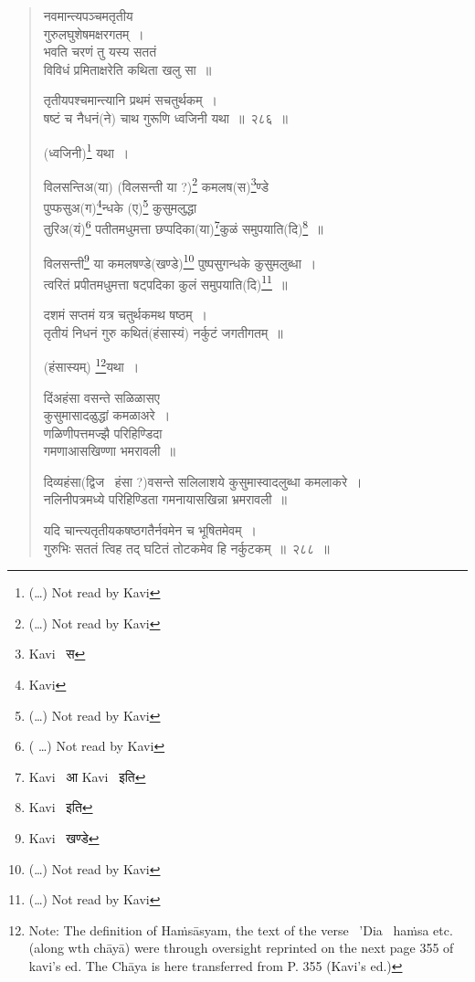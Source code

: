\documentclass[11pt, openany]{book}
\begin{document}
\begin{quote}
{\qt नवमान्त्यपञ्चमतृतीय\textendash \\
गुरुलघुशेषमक्षरगतम्~। \\
भवति चरणं तु यस्य सततं\\
 विविधं प्रमिताक्षरेति कथिता खलु सा~॥}

{\na तृतीयपश्चमान्त्यानि प्रथमं सचतुर्थकम्~। \\
षष्टं च नैधनं(ने) चाथ गुरूणि ध्वजिनी यथा~॥~२८६~॥}

(ध्वजिनी)\renewcommand{\thefootnote}{1}\footnote{(\ldots ) Not read by Kavi} यथा~। 

{\qt विलसन्तिअ(या) (विलसन्ती या ?)\renewcommand{\thefootnote}{2}\footnote{(\ldots ) Not read by Kavi} कमलष(स)\renewcommand{\thefootnote}{3}\footnote{Kavi \textendash\ स}ण्डे \\
पुप्फसुअ(ग)\renewcommand{\thefootnote}{4}\footnote{Kavi\textendash }न्धके (ए)\renewcommand{\thefootnote}{5}\footnote{(\ldots ) Not read by Kavi} कुसुमलुद्धा \\
तुरिअ(यं)\renewcommand{\thefootnote}{6}\footnote{( \ldots ) Not read by Kavi} पतीतमधुमत्ता छप्पदिका(या)\renewcommand{\thefootnote}{7}\footnote{Kavi \textendash\ आ Kavi \textendash\ इति}कुळं समुपयाति(दि)\renewcommand{\thefootnote}{8}\footnote{Kavi \textendash\ इति}~॥

विलसन्ती\renewcommand{\thefootnote}{9}\footnote{Kavi \textendash\ खण्डे} या कमलषण्डे(खण्डे)\renewcommand{\thefootnote}{10}\footnote{(\ldots ) Not read by Kavi} पुष्पसुगन्धके कुसुमलुब्धा~। \\
त्वरितं प्रपीतमधुमत्ता षट्पदिका कुलं समुपयाति(दि)\renewcommand{\thefootnote}{11}\footnote{(\ldots ) Not read by Kavi}~॥ 

दशमं सप्तमं यत्र चतुर्थकमथ षष्ठम्~।\\
तृतीयं निधनं गुरु कथितं(हंसास्यं) नर्कुटं जगतीगतम्~॥}

(हंसास्यम्) \renewcommand{\thefootnote}{12}\footnote{Note: The definition of Haṁsāsyam, the text of the verse \textendash\ 'Dia \textendash\ haṁsa etc. (along wth chāyā) were through oversight reprinted on the next page 355 of kavi's ed. The Chāya is here transferred from P. 355 (Kavi's ed.)}यथा~। 

{\qt दिंअहंसा वसन्ते सळिळासए \\
 कुसुमासादळुद्धां कमळाअरे~। \\
 णळिणीपत्तमज्झै परिहिण्डिदा\\
 गमणाआसखिण्णा भमरावली~॥

दिव्यहंसा(द्विज \textendash\ हंसा ?)वसन्ते सलिलाशये कुसुमास्वादलुब्धा कमलाकरे~। \\
नलिनीपत्रमध्ये परिहिण्डिता गमनायासखिन्ना भ्रमरावली~॥} 

{\na यदि चान्त्यतृतीयकषष्ठगतैर्नवमेन च भूषितमेवम्~। \\
गुरुभिः सततं त्विह तद् घटितं तोटकमेव हि नर्कुटकम्~॥~२८८~॥}
\end{quote}
\end{document}
